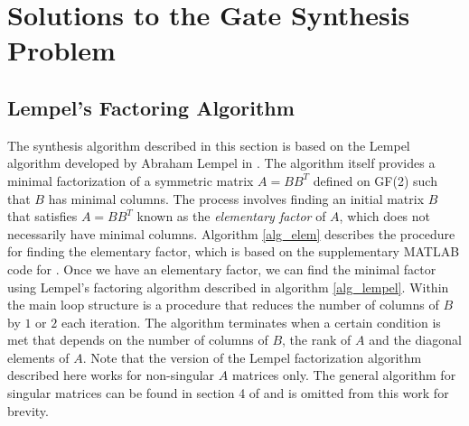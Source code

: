 \documentclass{article}
\theoremstyle{definition}
\theoremstyle{problem}
\theoremstyle{lemma}
\begin{document}
	
	
	\FloatBarrier
	\section{Solutions to the Gate Synthesis Problem}
	\label{s4_Solution}
		\FloatBarrier
		\subsection{Lempel's Factoring Algorithm}
		The synthesis algorithm described in this section is based on the Lempel algorithm developed by Abraham Lempel in \cite{36_Lempel_1975}. The algorithm itself provides a minimal factorization of a symmetric matrix $A=BB^T$ defined on GF(2) such that $B$ has minimal columns. The process involves finding an initial matrix $B$ that satisfies $A=BB^T$  known as the \emph{elementary factor} of $A$, which does not necessarily have minimal columns. Algorithm \ref{alg_elem} describes the procedure for finding the elementary factor, which is based on the supplementary MATLAB code for \cite{1_Campbell_2017}. Once we have an elementary factor, we can find the minimal factor using Lempel's factoring algorithm described in algorithm \ref{alg_lempel}. Within the main loop structure is a procedure that reduces the number of columns of $B$ by $1$ or $2$ each iteration. The algorithm terminates when a certain condition is met that depends on the number of columns of $B$, the rank of $A$ and the diagonal elements of $A$. Note that the version of the Lempel factorization algorithm described here works for non-singular $A$ matrices only. The general algorithm for singular matrices can be found in section 4 of \cite{36_Lempel_1975} and is omitted from this work for brevity.
		
\end{document}
